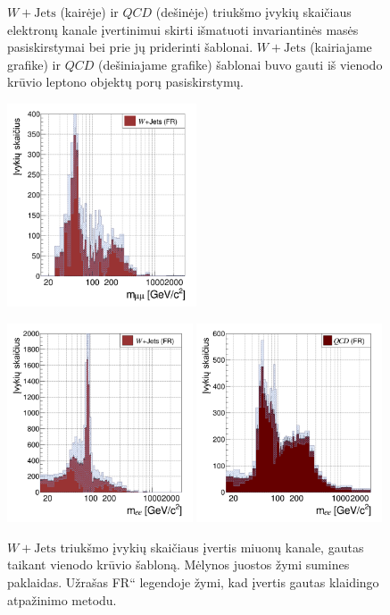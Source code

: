 \documentclass[a4paper, 12pt, oneside]{article}
\newcommand{\WJets}{W\! +\!\mathrm{Jets}}
\newcommand{\ltq}[1]{{\quotedblbase{}#1\textquotedblleft{}}}
\newcommand{\QCD}{QC\! D}
\newlength\q
\begin{document}
\begin{figure}[b!]
	\caption{\label{fig:MasseeFit}
		$\WJets$ (kairėje) ir $\QCD$ (dešinėje) triukšmo įvykių skaičiaus elektronų kanale įvertinimui skirti išmatuoti invariantinės
		masės pasiskirstymai bei prie jų priderinti šablonai.
		$\WJets$ (kairiajame grafike) ir $\QCD$ (dešiniajame grafike) šablonai buvo gauti iš vienodo krūvio leptono objektų porų pasiskirstymų.}
\end{figure}

\begin{figure}[b!]
	\RawFloats\centering
	\includegraphics[width=0.5\textwidth]{Magistrinis/WJETest_mumu_final.png}
	\caption{\label{fig:JETmumufit}
		$\WJets$ triukšmo įvykių skaičiaus įvertis miuonų kanale, gautas taikant vienodo krūvio šabloną.
		Mėlynos juostos žymi sumines paklaidas.
		Užrašas \ltq{FR} legendoje žymi, kad įvertis gautas klaidingo atpažinimo metodu.
	}
\vspace{2cm}
	\includegraphics[width=0.49\textwidth]{Magistrinis/WJETest_ee_final.png}
	\includegraphics[width=0.49\textwidth]{Magistrinis/QCDest_ee_final.png}

\end{figure}
\end{document}
